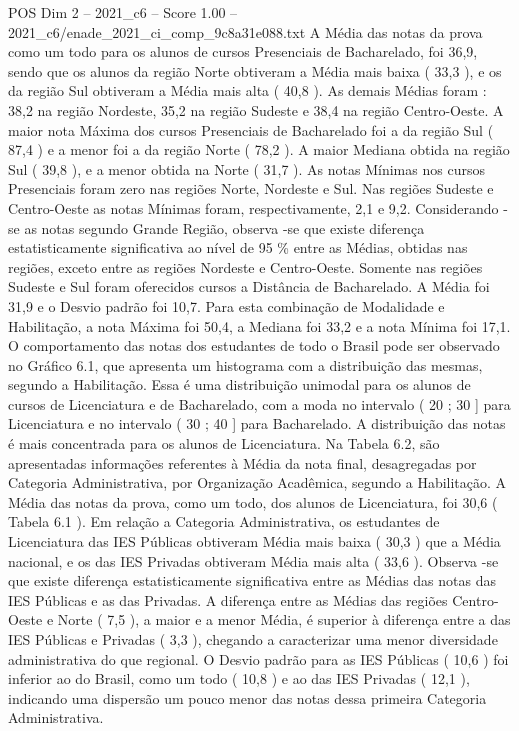\begin{textsample}{POS Dim 2 – 2021\_c6 – Score 1.00 – 2021\_c6/enade\_2021\_ci\_comp\_9c8a31e088.txt}
A Média das notas da prova como um todo para os alunos de cursos Presenciais de Bacharelado, foi 36,9, sendo que os alunos da região Norte obtiveram a Média mais baixa ( 33,3 ), e os da região Sul obtiveram a Média mais alta ( 40,8 ).
As demais Médias foram : 38,2 na região Nordeste, 35,2 na região Sudeste e 38,4 na região Centro-Oeste.
A maior nota Máxima dos cursos Presenciais de Bacharelado foi a da região Sul ( 87,4 ) e a menor foi a da região Norte ( 78,2 ).
A maior Mediana obtida na região Sul ( 39,8 ), e a menor obtida na Norte ( 31,7 ).
As notas Mínimas nos cursos Presenciais foram zero nas regiões Norte, Nordeste e Sul.
Nas regiões Sudeste e Centro-Oeste as notas Mínimas foram, respectivamente, 2,1 e 9,2.
Considerando -se as notas segundo Grande Região, observa -se que existe diferença estatisticamente significativa ao nível de 95 \% entre as Médias, obtidas nas regiões, exceto entre as regiões Nordeste e Centro-Oeste.
Somente nas regiões Sudeste e Sul foram oferecidos cursos a Distância de Bacharelado.
A Média foi 31,9 e o Desvio padrão foi 10,7.
Para esta combinação de Modalidade e Habilitação, a nota Máxima foi 50,4, a Mediana foi 33,2 e a nota Mínima foi 17,1.
O comportamento das notas dos estudantes de todo o Brasil pode ser observado no Gráfico 6.1, que apresenta um histograma com a distribuição das mesmas, segundo a Habilitação.
Essa é uma distribuição unimodal para os alunos de cursos de Licenciatura e de Bacharelado, com a moda no intervalo ( 20 ; 30 ] para Licenciatura e no intervalo ( 30 ; 40 ] para Bacharelado.
A distribuição das notas é mais concentrada para os alunos de Licenciatura.
Na Tabela 6.2, são apresentadas informações referentes à Média da nota final, desagregadas por Categoria Administrativa, por Organização Acadêmica, segundo a Habilitação.
A Média das notas da prova, como um todo, dos alunos de Licenciatura, foi 30,6 ( Tabela 6.1 ).
Em relação a Categoria Administrativa, os estudantes de Licenciatura das IES Públicas obtiveram Média mais baixa ( 30,3 ) que a Média nacional, e os das IES Privadas obtiveram Média mais alta ( 33,6 ).
Observa -se que existe diferença estatisticamente significativa entre as Médias das notas das IES Públicas e as das Privadas.
A diferença entre as Médias das regiões Centro-Oeste e Norte ( 7,5 ), a maior e a menor Média, é superior à diferença entre a das IES Públicas e Privadas ( 3,3 ), chegando a caracterizar uma menor diversidade administrativa do que regional.
O Desvio padrão para as IES Públicas ( 10,6 ) foi inferior ao do Brasil, como um todo ( 10,8 ) e ao das IES Privadas ( 12,1 ), indicando uma dispersão um pouco menor das notas dessa primeira Categoria Administrativa.

\end{textsample}
